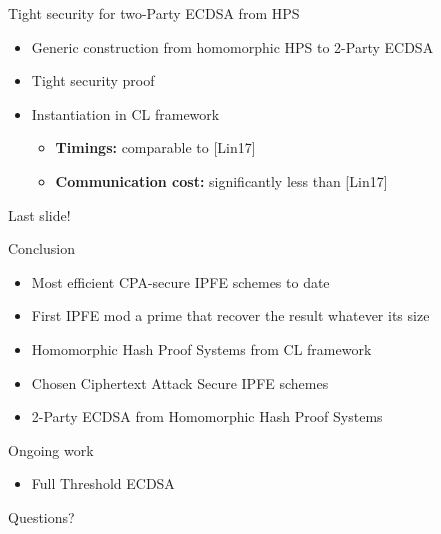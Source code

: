 \documentclass[10pt]{beamer}
\begin{document}
\begin{frame}{Tight security for two-Party ECDSA from HPS}
\begin{itemize}
\item Generic construction from homomorphic HPS to 2-Party ECDSA
\item Tight security proof
\item Instantiation in CL framework
\begin{itemize}
\item \textbf{Timings:} comparable to [Lin17]
\item \textbf{Communication cost:} significantly less than [Lin17]
\end{itemize}
\end{itemize}
\end{frame}


\begin{frame}{Last slide!}
\begin{block}{Conclusion}
\begin{itemize}
\item Most efficient CPA-secure IPFE schemes to date
\item First IPFE mod a prime that recover the result whatever its size
\item Homomorphic Hash Proof Systems from CL framework
\item Chosen Ciphertext Attack Secure IPFE schemes 
\item 2-Party ECDSA from Homomorphic Hash Proof Systems
\end{itemize}
\end{block}
\begin{block}{Ongoing work}
\begin{itemize}
\item Full Threshold ECDSA
\end{itemize}
\end{block}
\end{frame}

\begin{frame}[standout]
  Questions?
\end{frame}


\begin{frame}
%
%


\end{frame}
\end{document}
